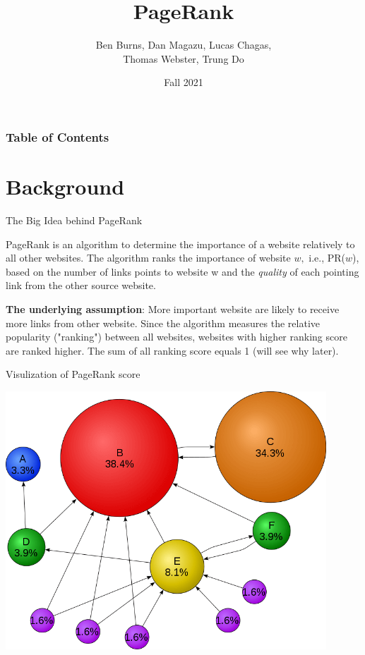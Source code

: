 \documentclass{beamer}
\title{PageRank}
\author{Ben Burns, Dan Magazu, Lucas Chagas, \\Thomas Webster, Trung Do}
\date{Fall 2021}
\begin{document}
\frame{\titlepage}

\begin{frame}
\frametitle{Table of Contents}
\tableofcontents
\end{frame}

\section{Background}
\begin{frame}[t]{The Big Idea behind PageRank}
\begin{outline}
    \1 PageRank is an algorithm to determine the importance of a website relatively to all other websites. The algorithm ranks the importance of website $w,$ i.e., PR($w$), based on the number of links points to website w and the \emph{quality} of each pointing link from the other source website. 

    \1 \textbf{The underlying assumption}: More important website are likely to receive more links from other website. Since the algorithm measures the relative popularity ("ranking") between all websites, websites with higher ranking score are ranked higher. The sum of all ranking score equals 1 (will see why later).
\end{outline}
\end{frame}

\begin{frame}{Visulization of PageRank score}
    \begin{center}
        \includegraphics[width=0.9\textwidth]{pagerankexample.png}
    \end{center}
\end{frame}
\end{document}
